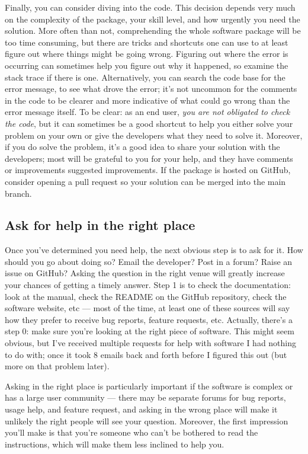 \documentclass[9pt,training]{livecoms}
\begin{document}
Finally, you can consider diving into the code. This decision depends very much
on the complexity of the package, your skill level, and how urgently you need
the solution. More often than not, comprehending the whole software package will
be too time consuming, but there are tricks and shortcuts one can use to at
least figure out where things might be going wrong. Figuring out where the error
is occurring can sometimes help you figure out why it happened, so examine the
stack trace if there is one. Alternatively, you can search the code base for the
error message, to see what drove the error; it's not uncommon for the comments
in the code to be clearer and more indicative of what could go wrong than the
error message itself. To be clear: as an end user, \emph{you are not obligated
to check the code}, but it can sometimes be a good shortcut to help you either
solve your problem on your own or give the developers what they need to solve
it. Moreover, if you do solve the problem, it's a good idea to share your
solution with the developers; most will be grateful to you for your help, and
they have comments or improvements suggested improvements. If the package is
hosted on GitHub, consider opening a pull request so your solution can be merged
into the main branch.

\subsection{Ask for help in the right place}

Once you've determined you need help, the next obvious step is to ask for it.
How should you go about doing so? Email the developer? Post in a forum? Raise an
issue on GitHub? Asking the question in the right venue will greatly increase
your chances of getting a timely answer. Step 1 is to check the documentation:
look at the manual, check the README on the GitHub repository, check the
software website, etc --- most of the time, at least one of these sources will
say how they prefer to receive bug reports, feature requests, etc. Actually,
there's a step 0: make sure you're looking at the right piece of software. This
might seem obvious, but I've received multiple requests for help with software I
had nothing to do with; once it took 8 emails back and forth before I figured
this out (but more on that problem later).

Asking in the right place is particularly important if the software is complex
or has a large user community --- there may be separate forums for bug reports,
usage help, and feature request, and asking in the wrong place will make it
unlikely the right people will see your question. Moreover, the first impression
you'll make is that you're someone who can't be bothered to read the
instructions, which will make them less inclined to help you.
\end{document}
